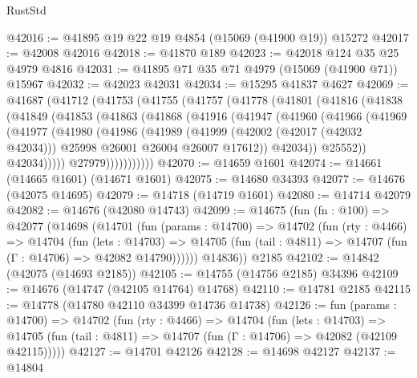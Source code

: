 \begin{lexlean}{RustStd}
\begin{coremodule}
@42016 := @41895 @19 @22 @19 @4854 (@15069 (@41900 @19)) @15272
@42017 := @42008 @42016
@42018 := @41870 @189
@42023 := @42018 @124 @35 @25 @4979 @4816
@42031 := @41895 @71 @35 @71 @4979 (@15069 (@41900 @71)) @15967
@42032 := @42023 @42031
@42034 := @15295 @41837 @4627
@42069 := @41687
    (@41712
      (@41753
        (@41755
          (@41757
            (@41778
              (@41801
                (@41816
                  (@41838
                    (@41849
                      (@41853
                        (@41863
                          (@41868
                            (@41916
                              (@41947
                                (@41960
                                  (@41966
                                    (@41969
                                      (@41977
                                        (@41980
                                          (@41986
                                            (@41989
                                              (@41999
                                                (@42002 (@42017 (@42032 @42034)))
                                                @25998
                                                @26001
                                                @26004
                                                @26007
                                                @17612))
                                            @42034))
                                        @25552))
                                    @42034)))))
                          @27979)))))))))))
@42070 := @14659 @1601
@42074 := @14661 (@14665 @1601) (@14671 @1601)
@42075 := @14680 @34393
@42077 := @14676 (@42075 @14695)
@42079 := @14718 (@14719 @1601)
@42080 := @14714 @42079
@42082 := @14676 (@42080 @14743)
@42099 := @14675
    (fun (fn : @100) =>
    @42077
      (@14698
        (@14701
          (fun (params : @14700) =>
          @14702
            (fun (rty : @4466) =>
            @14704
              (fun (lets : @14703) =>
              @14705 (fun (tail : @4811) => @14707 (fun (Γ : @14706) => @42082 @14790))))))
        @14836))
    @2185
@42102 := @14842 (@42075 (@14693 @2185))
@42105 := @14755 (@14756 @2185) @34396
@42109 := @14676 (@14747 (@42105 @14764) @14768)
@42110 := @14781 @2185
@42115 := @14778 (@14780 @42110 @34399 @14736 @14738)
@42126 := fun (params : @14700) =>
  @14702
    (fun (rty : @4466) =>
    @14704
      (fun (lets : @14703) =>
      @14705 (fun (tail : @4811) => @14707 (fun (Γ : @14706) => @42082 (@42109 @42115)))))
@42127 := @14701 @42126
@42128 := @14698 @42127
@42137 := @14804

\end{coremodule}
\end{lexlean}
